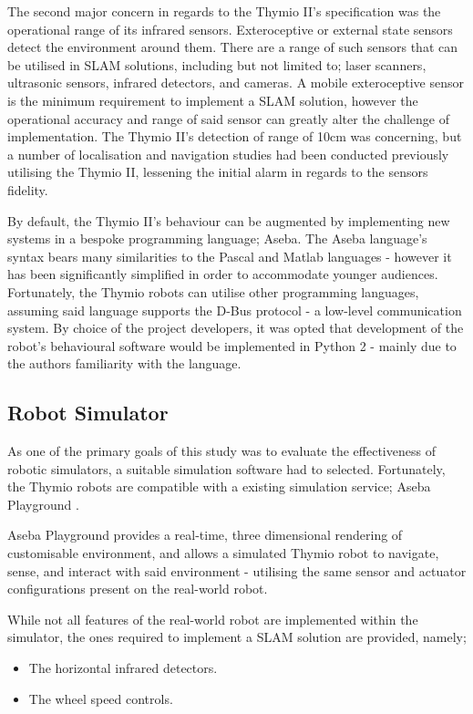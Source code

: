 The second major concern in regards to the Thymio II's specification was the
operational range of its infrared sensors.
Exteroceptive or external state sensors detect the environment around
them.
There are a range of such sensors that can be utilised in SLAM solutions,
including but not limited to; laser scanners, ultrasonic sensors, infrared
detectors, and cameras.
A mobile exteroceptive sensor is the minimum requirement to implement a SLAM
solution, however the operational accuracy and range of said sensor can
greatly alter the challenge of implementation.
The Thymio II's detection of range of 10cm was concerning, but a number of
localisation and navigation studies had been conducted previously
\cite{Wang2016} utilising the Thymio II, lessening the initial alarm in
regards to the sensors fidelity.

By default, the Thymio II's behaviour can be augmented by implementing
new systems in a bespoke programming language; Aseba.
The Aseba language's syntax bears many similarities to the Pascal and
Matlab languages - however it has been significantly simplified in order to
accommodate younger audiences.
Fortunately, the Thymio robots can utilise other programming languages,
assuming said language supports the D-Bus protocol - a low-level communication
system.
By choice of the project developers, it was opted that development of the
robot's behavioural software would be implemented in Python 2 - mainly due to
the authors familiarity with the language.

\subsection{Robot Simulator}
As one of the primary goals of this study was to evaluate the effectiveness of
robotic simulators, a suitable simulation software had to selected.
Fortunately, the Thymio robots are compatible with a existing simulation
service; Aseba Playground \cite{aseba-community}.

Aseba Playground provides a real-time, three dimensional rendering of
customisable environment, and allows a simulated Thymio robot to navigate,
sense, and interact with said environment - utilising the same sensor and
actuator configurations present on the real-world robot.

While not all features of the real-world robot are implemented within the
simulator, the ones required to implement a SLAM solution are provided, namely;

\begin{itemize}
\item The horizontal infrared detectors.
\item The wheel speed controls.
\end{itemize}


